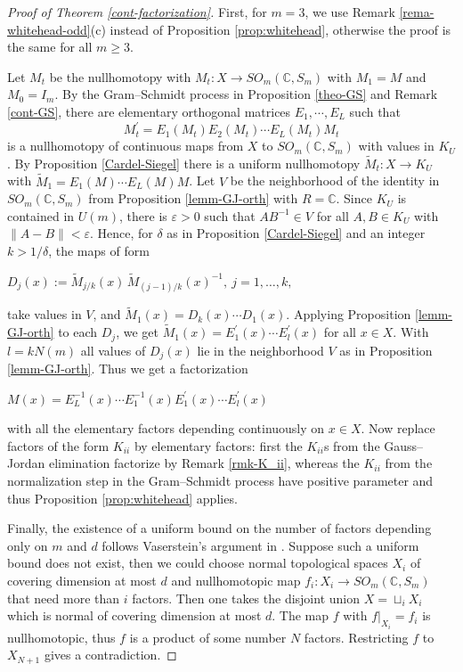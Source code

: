 \documentclass[11pt]{amsart}
\theoremstyle{definition}
\theoremstyle{remark}
\theoremstyle{remark}
\newcommand{\C}{\mathbb{C}}
\begin{document}
\begin{proof}[Proof of Theorem \ref{cont-factorization}]

First, for $m=3$, we use Remark \ref{rema-whitehead-odd}(c) instead of Proposition \ref{prop:whitehead}, otherwise the proof is the same for all $m \ge 3$.



Let $M_t$ be the nullhomotopy with $M_t: X \to SO_{m} (\mathbb C, S_m)$ with $M_1 = M$ and $M_0 = I_m$. By the Gram--Schmidt process in Proposition \ref{theo-GS} and Remark \ref{cont-GS}, there are elementary orthogonal matrices
$E_1, \cdots, E_L$ such that 
$$
    M^{\prime}_t = E_1(M_t)E_2(M_t)\cdots E_L(M_t)M_t
$$ 
is a nullhomotopy of continuous maps from $X$ to $SO_m(\C, S_m)$ with values in $K_U$. By Proposition \ref{Cardel-Siegel} there is a uniform nullhomotopy $\tilde{M}_t: X \to K_U$ with
$\tilde{M}_1 = E_1(M)\cdots E_L(M)M$. Let $V$ be the neighborhood of the identity in $SO_{m} (\mathbb C, S_m)$ from Proposition \ref{lemm-GJ-orth} with $R = \mathbb C$. Since $K_U$ is contained in $U(m)$, there is $\varepsilon > 0$ such that $AB^{-1} \in V$ for all $A, B \in K_U$ with $\|A - B\| < \varepsilon$. Hence, for $\delta$ as in Proposition \ref{Cardel-Siegel} and an integer $k > 1/\delta$, the maps of form 
\begin{center}
    $D_j(x) := \tilde{M}_{j/k}(x)\, \tilde{M}_{(j-1)/k}(x)^{-1}, \ j = 1, \dots, k,$
\end{center}
take values in $V$, and $\tilde{M}_1(x) = D_k(x) \cdots D_1(x)$. Applying Proposition \ref{lemm-GJ-orth} to each $D_j$, 
we get $\tilde{M}_1(x) = E^{\prime}_1(x)\cdots E^{\prime}_l(x)$ for all $x \in X$. With $l = k N(m)$  all values of $D_j(x)$ lie in the neighborhood $V$ as in Proposition \ref{lemm-GJ-orth}. Thus we get a factorization
\begin{center}
 $M(x) = E^{-1}_L(x) \cdots E^{-1}_1(x)E^{\prime}_1(x)\cdots E^{\prime}_l(x)$
\end{center}
with all the elementary factors depending continuously on $x \in X$. Now replace factors of the form $K_{ii}$ by elementary factors: first the $K_{ii}$s from the Gauss--Jordan elimination factorize by Remark \ref{rmk-K_ii}, whereas the $K_{ii}$ from the normalization step in the Gram--Schmidt process have positive parameter and thus Proposition \ref{prop:whitehead} applies. 

Finally, the existence of a uniform bound on the number of factors depending only on $m$ and $d$ follows Vaserstein's argument in \cite[proof of Theorem 2]{04073958}. Suppose such a uniform bound does not exist, then we could choose normal topological spaces $X_i$ of covering dimension at most $d$ and nullhomotopic map $f_i : X_i \to SO_m(\C, S_m)$ that need more than $i$ factors. Then one takes the disjoint union $X = \sqcup_i X_i$ which is normal of covering dimension at most $d$. The map $f$ with $f \vert_{X_i} = f_i$ is nullhomotopic, thus $f$ is a product of some number $N$ factors. Restricting $f$ to $X_{N+1}$ gives a contradiction. 
\end{proof}
\end{document}
